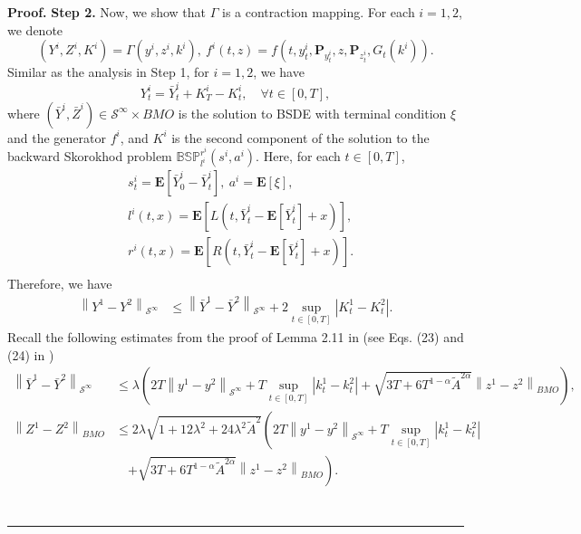 \documentclass[10pt]{article}%
\numberwithin{equation}{section}
\newenvironment{proof}[1][Proof]{\noindent \textbf{#1.} }{\  \rule{0.5em}{0.5em}}
\def \E{\mathbf{E}}
\def \P{\mathbf{P}}
\begin{document}
\begin{proof}
\textbf{Step 2.} Now, we show that $\Gamma$ is a contraction mapping.  For each $i=1,2$, we denote 
$$
(Y^i,Z^i,K^i)=\Gamma(y^i,z^i,k^i), \ f^i(t,z)=f(t,y^i_{t},\P_{y^i_{t}},z,\P_{z^i_{t}},G_{t}(k^i)).
$$
Similar as the analysis in Step 1, for $i=1,2$, we have     
\begin{equation}\label{re-2}
Y^{i}_t=\bar{Y}^{i}_{t}+K^{i}_{T}-K^{i}_t, \quad \forall t\in[0,T],   
\end{equation} 
where $(\bar{Y}^i,\bar{Z}^i)\in\mathcal{S}^{\infty}\times BMO$ is the solution to BSDE with terminal condition $\xi$ and the generator $f^i$, and $K^i$ is the second component of the solution to the backward Skorokhod problem $\mathbb{BSP}_{l^i}^{r^i}(s^i,a^i)$. Here, for each $t\in[0,T]$,  
\begin{equation}\label{bsalri}\begin{split}
&s^i_t=\E\left[\bar{Y}^i_{0}-\bar{Y}^i_{t}\right],\ a^i=\mathbf{E}[\xi],\\
&l^i(t,x)=\E\left[L(t,\bar{Y}^i_{t}-\E\left[\bar{Y}^i_{t}\right]+x)\right],\\
&r^i(t,x)=\E\left[R(t,\bar{Y}^i_{t}-\E\left[\bar{Y}^i_{t}\right]+x)\right].\\
\end{split}\end{equation}
Therefore, we have
\begin{equation}\begin{split}
   \left\|Y^1-Y^2\right\|_{\mathcal{S}^{\infty}}%
   &\leq \left\|\bar{Y}^1-\bar{Y}^2\right\|_{\mathcal{S}^{\infty}}+2\sup_{t\in[0,T]}\left|K^1_t-K_t^2\right|.
\end{split}   
\end{equation}
Recall the following estimates from the proof 
of Lemma 2.11 in \cite{LP} (see Eqs. (23) and (24) in \cite{LP})
$$
\begin{aligned}
   \left\|\bar{Y}^1-\bar{Y}^2\right\|_{\mathcal{S}^{\infty}} &\leq \lambda \left(2T\left\|y^1-y^2\right\|_{\mathcal{S}^{\infty}}+T\sup_{t\in[0,T]}\left|k_t^1-k_t^2\right|+\sqrt{3T+6T^{1-\alpha}\tilde{A}^{2\alpha}}\left\|z^1-z^2\right\|_{BMO}\right),\\
   \left\|Z^1-Z^2\right\|_{BMO}&\leq 2\lambda \sqrt{1+12\lambda^2+24 \lambda^2\tilde{A}^2}\left(2T\left\|y^1-y^2\right\|_{\mathcal{S}^{\infty}}+T\sup_{t\in[0,T]}\left|k_t^1-k_t^2\right|\right. \\
   &\quad \left.+\sqrt{3T+6T^{1-\alpha}\tilde{A}^{2\alpha}}\left\|z^1-z^2\right\|_{BMO}\right).\\

\end{aligned}$$
\end{proof}
\end{document}
